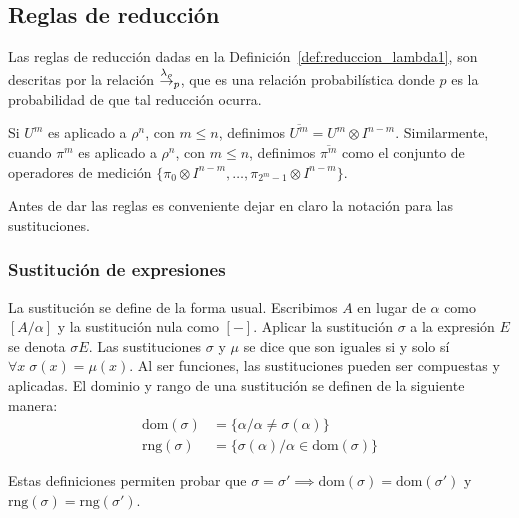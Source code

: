 \subsection{Reglas de reducción}
Las reglas de reducción dadas en la Definición~\ref{def:reduccion_lambda1}, son descritas por la relación $\overset{\lambda_\rho}{\rightarrow}_p$, que es una relación probabilística donde $p$ es la probabilidad de que tal reducción ocurra.


Si $U^m$ es aplicado a $\rho^n$, con $m \leq n$, definimos $\overline{U ^m} = U^m \otimes I^{n-m}$. Similarmente, cuando $\pi^m$ es aplicado a $\rho^n$, con $m \leq n$, definimos $\overline{\pi^m}$ como el conjunto de operadores de medición $\{\pi_0\otimes I^{n-m}, \dots, \pi_{2^m-1} \otimes I^{n-m}\}$. 

Antes de dar las reglas es conveniente dejar en claro la notación para las sustituciones.


\subsubsection{Sustitución de expresiones}

La sustitución se define de la forma usual. Escribimos $A$ en lugar de $\alpha$ como $[A/\alpha]$ y la sustitución nula como $[-]$. Aplicar la sustitución $\sigma$ a la expresión $E$ se denota $\sigma E$.
Las sustituciones $\sigma$ y $\mu$ se dice que son iguales si y solo sí $\forall x\;\sigma(x)=\mu(x)$.
Al ser funciones, las sustituciones pueden ser compuestas y aplicadas. El dominio y rango de una sustitución se definen de la siguiente manera:
\begin{align}
    \text{dom}(\sigma) &= \{\alpha / \alpha \neq \sigma(\alpha)\} \\
    \text{rng}(\sigma) &= \{\sigma(\alpha) / \alpha \in \text{dom}(\sigma)\} 
\end{align}

Estas definiciones permiten probar que $\sigma=\sigma' \implies \text{dom}(\sigma) = \text{dom}(\sigma')$ y $\text{rng}(\sigma)=\text{rng}(\sigma')$.


